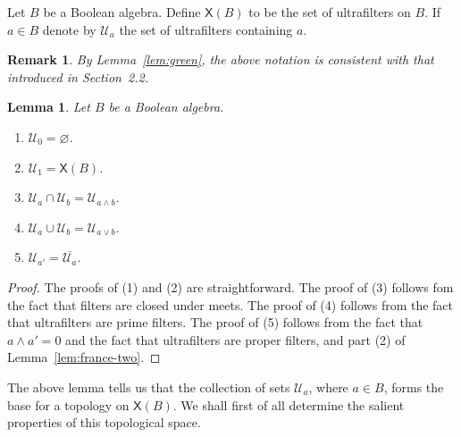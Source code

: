 \documentclass[a4paper]{amsart}
\newtheorem{lemma}[theorem]{Lemma}
\newtheorem{remark}[theorem]{Remark}
\begin{document}
Let $B$ be a Boolean algebra.
Define $\mathsf{X}(B)$ to be the set of ultrafilters on $B$.
If $a \in B$ denote by $\mathscr{U}_{a}$ the set of ultrafilters containing $a$.

\begin{remark}{\em By Lemma~\ref{lem:green}, the above notation is consistent
with that introduced in Section~2.2.}
\end{remark}

\begin{lemma}\label{lem:estonia} Let $B$ be a Boolean algebra.
\begin{enumerate}
\item $\mathscr{U}_{0} = \varnothing$.
\item $\mathscr{U}_{1} = \mathsf{X}(B)$.
\item $\mathscr{U}_{a} \cap \mathscr{U}_{b} = \mathscr{U}_{a \wedge b}$.
\item $\mathscr{U}_{a} \cup \mathscr{U}_{b} = \mathscr{U}_{a \vee b}$.
\item $\mathscr{U}_{a'} =  \overline{\mathscr{U}_{a}}$.
\end{enumerate}
\end{lemma}
\begin{proof} The proofs of (1) and (2) are straightforward.
The proof of (3) follows fom the fact that filters are closed under meets.
The proof of (4) follows from the fact that ultrafilters are prime filters.
The proof of (5) follows from the fact that $a \wedge a' = 0$
and the fact that ultrafilters are proper filters, 
and part (2) of Lemma~\ref{lem:france-two}.
\end{proof}

The above lemma tells us that the collection of sets  $\mathscr{U}_{a}$, where $a \in B$,
forms the base for a topology on $\mathsf{X}(B)$.
We shall first of all determine the salient properties of this topological space. 
\end{document}
